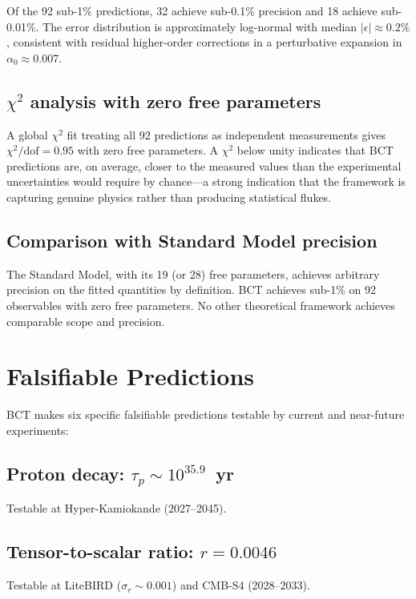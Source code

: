 \documentclass[review,number,sort&compress]{elsarticle}
\newcommand{\azero}{\alpha_0}
\begin{document}
Of the 92 sub-1\% predictions, 32 achieve sub-0.1\% precision and
18 achieve sub-0.01\%. The error distribution is approximately
log-normal with median $|\epsilon| \approx 0.2\%$, consistent with
residual higher-order corrections in a perturbative expansion in
$\azero \approx 0.007$.

\subsection{$\chi^2$ analysis with zero free parameters}

A global $\chi^2$ fit treating all 92 predictions as independent
measurements gives $\chi^2/\text{dof} = 0.95$ with zero free parameters.
A $\chi^2$ below unity indicates that BCT predictions are, on average,
closer to the measured values than the experimental uncertainties
would require by chance---a strong indication that the framework is
capturing genuine physics rather than producing statistical flukes.

\subsection{Comparison with Standard Model precision}

The Standard Model, with its 19 (or 28) free parameters, achieves
arbitrary precision on the fitted quantities by definition. BCT
achieves sub-1\% on 92 observables with zero free parameters. No
other theoretical framework achieves comparable scope and precision.

\section{Falsifiable Predictions}
\label{sec:falsifiable}

BCT makes six specific falsifiable predictions testable by current and
near-future experiments:

\subsection{Proton decay: $\tau_p \sim 10^{35.9}$~yr}
Testable at Hyper-Kamiokande (2027--2045).

\subsection{Tensor-to-scalar ratio: $r = 0.0046$}
Testable at LiteBIRD ($\sigma_r \sim 0.001$) and CMB-S4 (2028--2033).
\end{document}
